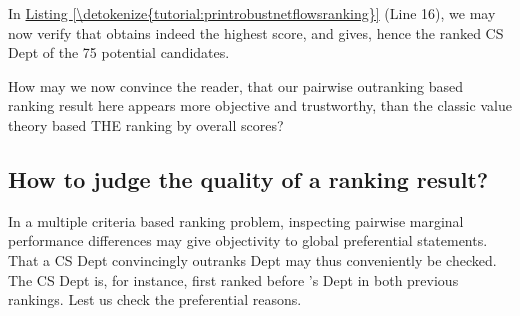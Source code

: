 \documentclass[a4paper,12pt,english]{sphinxhowto}
\begin{document}
In \hyperref[\detokenize{tutorial:printrobustnetflowsranking}]{Listing \ref{\detokenize{tutorial:printrobustnetflowsranking}}} (Line 16), we may now verify that  obtains indeed the highest  score, and gives, hence the  \sphinxhyphen{}ranked CS Dept of the 75 potential candidates.

How may we now convince the reader, that our pairwise outranking based ranking result here appears more objective and trustworthy, than the classic value theory based THE ranking by overall scores?


\subsection{How to judge the quality of a ranking result?}
\label{\detokenize{tutorial:how-to-judge-the-quality-of-a-ranking-result}}
In a multiple criteria based ranking problem, inspecting pairwise marginal performance differences may give objectivity to global preferential statements. That a CS Dept  convincingly outranks Dept  may thus conveniently be checked. The  CS Dept is, for instance, first ranked before ’s Dept in both previous rankings. Lest us check the preferential reasons.
\def\sphinxLiteralBlockLabel{\label{\detokenize{tutorial:pairwisecomparisons}}}
\end{document}
